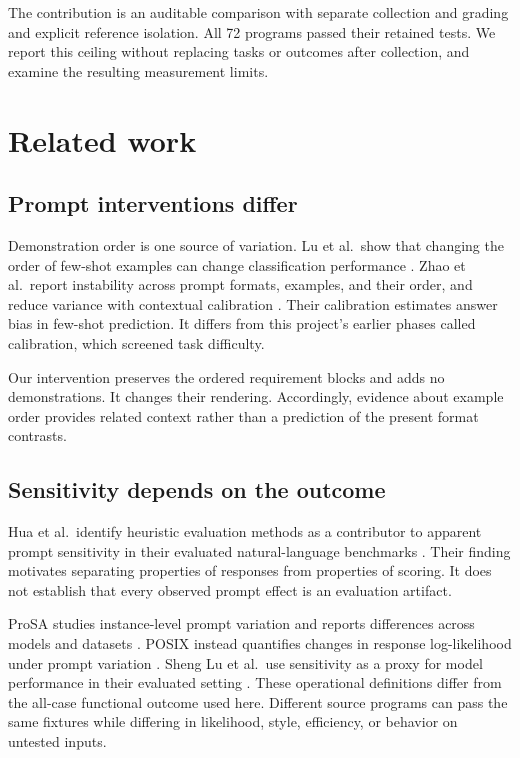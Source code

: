 \documentclass[conference,a4paper]{IEEEtran}
\newcommand{\evidencecite}[3]{\cite[#3]{#2}}
\begin{document}
The contribution is an auditable comparison with separate collection and grading and explicit reference isolation. All 72 programs passed their retained tests. We report this ceiling without replacing tasks or outcomes after collection, and examine the resulting measurement limits.

\section{Related work}
\subsection{Prompt interventions differ}
Demonstration order is one source of variation. Lu et al.\ show that changing the order of few-shot examples can change classification performance \evidencecite{C02}{lu-etal-2022-fantastically}{p.~8086}. Zhao et al.\ report instability across prompt formats, examples, and their order, and reduce variance with contextual calibration \evidencecite{C08}{pmlr-v139-zhao21c}{PDF p.~1}. Their calibration estimates answer bias in few-shot prediction. It differs from this project's earlier phases called calibration, which screened task difficulty.

Our intervention preserves the ordered requirement blocks and adds no demonstrations. It changes their rendering. Accordingly, evidence about example order provides related context rather than a prediction of the present format contrasts.

\subsection{Sensitivity depends on the outcome}
Hua et al.\ identify heuristic evaluation methods as a contributor to apparent prompt sensitivity in their evaluated natural-language benchmarks \evidencecite{C03}{hua-etal-2025-flaw}{p.~19889}. Their finding motivates separating properties of responses from properties of scoring. It does not establish that every observed prompt effect is an evaluation artifact.

ProSA studies instance-level prompt variation and reports differences across models and datasets \evidencecite{C04}{zhuo-etal-2024-prosa}{p.~1950}. POSIX instead quantifies changes in response log-likelihood under prompt variation \evidencecite{C05}{chatterjee-etal-2024-posix}{p.~14550}. Sheng Lu et al.\ use sensitivity as a proxy for model performance in their evaluated setting \evidencecite{C07}{lu-etal-2024-prompts}{p.~5833}. These operational definitions differ from the all-case functional outcome used here. Different source programs can pass the same fixtures while differing in likelihood, style, efficiency, or behavior on untested inputs.
\end{document}
